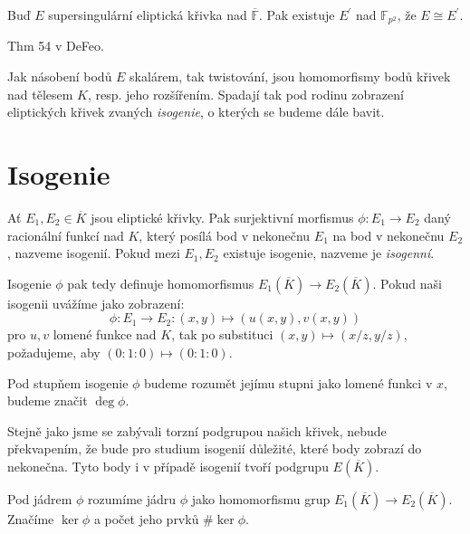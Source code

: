 \documentclass [12pt]{report}
\begin{document}
\begin{veta}
Buď $E$ supersingulární eliptická křivka nad $\overline{\mathbb{F}}$. Pak existuje $E^\prime$ nad $\mathbb{F}_{p^2}$, že $E \cong E^\prime$.
\end{veta}

\begin{veta}
Thm 54 v DeFeo. 
\end{veta}


Jak násobení bodů $E$ skalárem, tak twistování, jsou homomorfismy bodů křivek nad tělesem $K$, resp. jeho rozšířením. Spadají tak pod rodinu zobrazení eliptických křivek zvaných \textit{isogenie}, o kterých se budeme dále bavit.

\section{Isogenie}



\begin{definice}
Ať $E_1,E_2 \in \overline{K}$ jsou eliptické křivky. Pak surjektivní morfismus $\phi: E_1 \longrightarrow E_2$  daný racionální funkcí nad $K$,  který posílá bod v nekonečnu $E_1$ na bod v nekonečnu $E_2$, nazveme isogenií. Pokud mezi $E_1,E_2$ existuje isogenie, nazveme je \textit{isogenní}.
\end{definice}

Isogenie $\phi$ pak tedy definuje homomorfismus $E_1(\overline{K}) \longrightarrow E_2 (\overline{K})$. Pokud naši isogenii uvážíme jako zobrazení:
\begin{equation*}
\phi: E_1 \longrightarrow E_2 :  (x,y) \mapsto (u(x,y),v(x,y))
\end{equation*}
pro $u,v$ lomené funkce nad $K$, tak po substituci $(x,y) \mapsto (x/z,y/z)$, požadujeme, aby $(0:1:0) \mapsto (0:1:0)$. 

\begin{definice}
Pod stupňem isogenie $\phi$ budeme rozumět jejímu stupni jako lomené funkci v $x$, budeme značit $\deg \phi$. 
\end{definice}

Stejně jako jsme se zabývali torzní podgrupou našich křivek, nebude překvapením, že bude pro studium isogenií důležité, které body zobrazí do nekonečna. Tyto body i v případě isogenií tvoří podgrupu $E(\overline{K})$.


\begin{definice}
Pod jádrem $\phi$ rozumíme jádru $\phi$ jako homomorfismu grup $E_1 (\overline{K}) \longrightarrow E_2 (\overline{K})$. Značíme $\ker \phi$ a počet jeho prvků $\# \ker \phi$. 
\end{definice}
\end{document}
